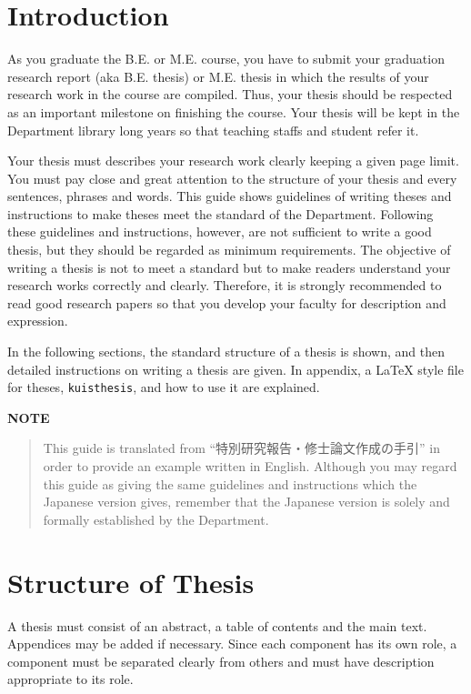\documentclass[master,english]{kuisthesis}
\begin{document}
\tableofcontents				%

\section{Introduction}\label{sec-intro}		%
As you graduate the B.E. or M.E. course, you have to submit your graduation
research report (aka B.E. thesis) or M.E. thesis in which the results of
your research work in the course are compiled.  Thus, your thesis should be
respected as an important milestone on finishing the course.  Your thesis
will be kept in the Department library long years so that teaching staffs
and student refer it.

Your thesis must describes your research work clearly keeping a given page
limit.  You must pay close and great attention to the structure of your
thesis and every sentences, phrases and words.  This guide shows guidelines
of writing theses and instructions to make theses meet the standard of the
Department.  Following these guidelines and instructions, however, are not
sufficient to write a good thesis, but they should be regarded as minimum
requirements.  The objective of writing a thesis is not to meet a standard
but to make readers understand your research works correctly and clearly.
Therefore, it is strongly recommended to read good research papers so that
you develop your faculty for description and expression.

In the following sections, the standard structure of a thesis is shown, and
then detailed instructions on writing a thesis are given.  In appendix, a
\LaTeX{} style file for theses, \verb|kuisthesis|, and how to use it are
explained.

\par\bigskip\centerline{\bf NOTE}
\begin{quote}
This guide is translated from ``特別研究報告・修士論文作成の手引'' in order
to provide an example written in English.  Although you may regard this
guide as giving the same guidelines and instructions which the Japanese
version gives, remember that the Japanese version is solely and formally
established by the Department.
\end{quote}

\section{Structure of Thesis}\label{sec-structure}
A thesis must consist of an abstract, a table of contents and the main text.
Appendices may be added if necessary.  Since each component has its own role,
a component must be separated clearly from others and must have description
appropriate to its role.

\end{document}
